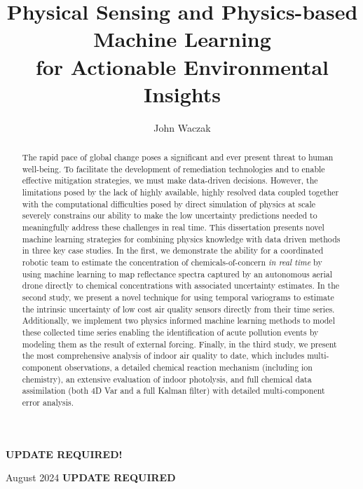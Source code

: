 \documentclass[doublespacing]{utdthesis}
\author{John Waczak}
\title{Physical Sensing and Physics-based Machine Learning \\ for Actionable Environmental Insights}
\begin{document}
\frontmatter

\signaturepage


\begin{dedication} %
  \color{red}
  \textbf{UPDATE REQUIRED!}
\end{dedication}


\maketitle

\begin{acks}{August 2024} %
  \color{red}
  \textbf{UPDATE REQUIRED} %
\end{acks}

\begin{abstract}

  The rapid pace of global change poses a significant and ever present threat to human well-being. To facilitate the development of remediation technologies and to enable effective mitigation strategies, we must make data-driven decisions. However, the limitations posed by the lack of highly available, highly resolved data coupled together with the computational diﬀiculties posed by direct simulation of physics at scale severely constrains our ability to make the low uncertainty predictions needed to meaningfully address these challenges in real time. This dissertation presents novel machine learning strategies for combining physics knowledge with data driven methods in three key case studies. In the first, we demonstrate the ability for a coordinated robotic team to estimate the concentration of chemicals-of-concern \textit{in real time} by using machine learning to map reflectance spectra captured by an autonomous aerial drone directly to chemical concentrations with associated uncertainty estimates. In the second study, we present a novel technique for using temporal variograms to estimate the intrinsic uncertainty of low cost air quality sensors directly from their time series. Additionally, we implement two physics informed machine learning methods to model these collected time series enabling the identification of acute pollution events by modeling them as the result of external forcing. Finally, in the third study, we present the most comprehensive analysis of indoor air quality to date, which includes multi-component observations, a detailed chemical reaction mechanism (including ion chemistry), an extensive evaluation of indoor photolysis, and full chemical data assimilation (both 4D Var and a full Kalman filter) with detailed multi-component error analysis.



\end{abstract}
\end{document}
